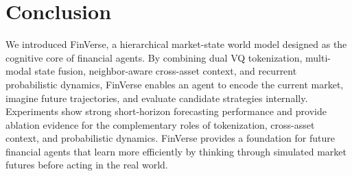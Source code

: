 \documentclass[letterpaper]{article}
\begin{document}
\section{Conclusion}
We introduced FinVerse, a hierarchical market-state world model designed as the cognitive core of financial agents. By combining dual VQ tokenization, multi-modal state fusion, neighbor-aware cross-asset context, and recurrent probabilistic dynamics, FinVerse enables an agent to encode the current market, imagine future trajectories, and evaluate candidate strategies internally. Experiments show strong short-horizon forecasting performance and provide ablation evidence for the complementary roles of tokenization, cross-asset context, and probabilistic dynamics. FinVerse provides a foundation for future financial agents that learn more efficiently by thinking through simulated market futures before acting in the real world.
\end{document}

